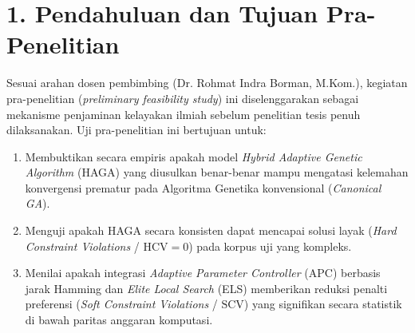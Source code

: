 \documentclass[a4paper,11pt]{article}
\begin{document}
\section*{1. Pendahuluan dan Tujuan Pra-Penelitian}
Sesuai arahan dosen pembimbing (Dr. Rohmat Indra Borman, M.Kom.), kegiatan pra-penelitian (\textit{preliminary feasibility study}) ini diselenggarakan sebagai mekanisme penjaminan kelayakan ilmiah sebelum penelitian tesis penuh dilaksanakan. Uji pra-penelitian ini bertujuan untuk:
\begin{enumerate}\setlength\itemsep{0em}
    \item Membuktikan secara empiris apakah model \textit{Hybrid Adaptive Genetic Algorithm} (HAGA) yang diusulkan benar-benar mampu mengatasi kelemahan konvergensi prematur pada Algoritma Genetika konvensional (\textit{Canonical GA}).
    \item Menguji apakah HAGA secara konsisten dapat mencapai solusi layak (\textit{Hard Constraint Violations} / $\text{HCV} = 0$) pada korpus uji yang kompleks.
    \item Menilai apakah integrasi \textit{Adaptive Parameter Controller} (APC) berbasis jarak Hamming dan \textit{Elite Local Search} (ELS) memberikan reduksi penalti preferensi (\textit{Soft Constraint Violations} / $\text{SCV}$) yang signifikan secara statistik di bawah paritas anggaran komputasi.
\end{enumerate}

\end{document}
